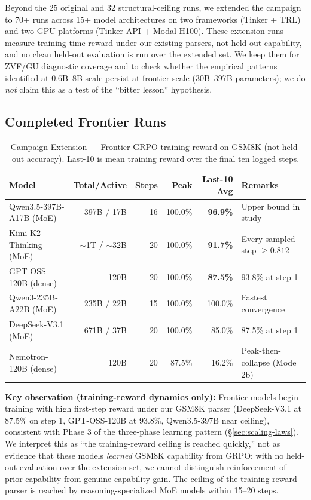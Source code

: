 \documentclass[12pt,a4paper]{report}
\theoremstyle{definition}
\begin{document}
Beyond the 25 original and 32 structural-ceiling runs, we extended the
campaign to 70+ runs across 15+ model architectures on two frameworks
(Tinker + TRL) and two GPU platforms (Tinker API + Modal H100).  These
extension runs measure training-time reward under our existing parsers,
not held-out capability, and no clean held-out evaluation is run over the
extended set.  We keep them for ZVF/GU diagnostic coverage and to check
whether the empirical patterns identified at 0.6B--8B scale persist at
frontier scale (30B--397B parameters); we do \emph{not} claim this as a
test of the ``bitter lesson'' hypothesis.

\subsection{Completed Frontier Runs}

\begin{table}[htbp]
\centering
\caption{Campaign Extension --- Frontier GRPO training reward on GSM8K (not held-out accuracy). Last-10 is mean training reward over the final ten logged steps.}
\label{tab:bitter-lesson}
\footnotesize
\begin{tabular}{lrrrrl}
\toprule
\textbf{Model} & \textbf{Total/Active} & \textbf{Steps} & \textbf{Peak} & \textbf{Last-10 Avg} & \textbf{Remarks} \\
\midrule
Qwen3.5-397B-A17B (MoE) & 397B / 17B & 16 & 100.0\% & \textbf{96.9\%} & Upper bound in study \\
Kimi-K2-Thinking (MoE) & $\sim$1T / $\sim$32B & 20 & 100.0\% & \textbf{91.7\%} & Every sampled step $\ge 0.812$ \\
GPT-OSS-120B (dense) & 120B & 20 & 100.0\% & \textbf{87.5\%} & 93.8\% at step 1 \\
Qwen3-235B-A22B (MoE) & 235B / 22B & 15 & 100.0\% & 100.0\% & Fastest convergence \\
DeepSeek-V3.1 (MoE) & 671B / 37B & 20 & 100.0\% & 85.0\% & 87.5\% at step 1 \\
Nemotron-120B (dense) & 120B & 20 & 87.5\% & 16.2\% & Peak-then-collapse (Mode 2b) \\
\bottomrule
\end{tabular}
\end{table}

\textbf{Key observation (training-reward dynamics only):} Frontier models begin training with
high first-step reward under our GSM8K parser (DeepSeek-V3.1 at 87.5\% on step 1, GPT-OSS-120B at 93.8\%,
Qwen3.5-397B near ceiling), consistent with Phase 3 of the three-phase learning pattern
(\S\ref{sec:scaling-laws}).  We interpret this as ``the training-reward ceiling is reached quickly,''
not as evidence that these models \emph{learned} GSM8K capability from GRPO: with no held-out evaluation
over the extension set, we cannot distinguish reinforcement-of-prior-capability from genuine capability
gain.  The ceiling of the training-reward parser is reached by reasoning-specialized MoE models within
15--20 steps.
\end{document}
